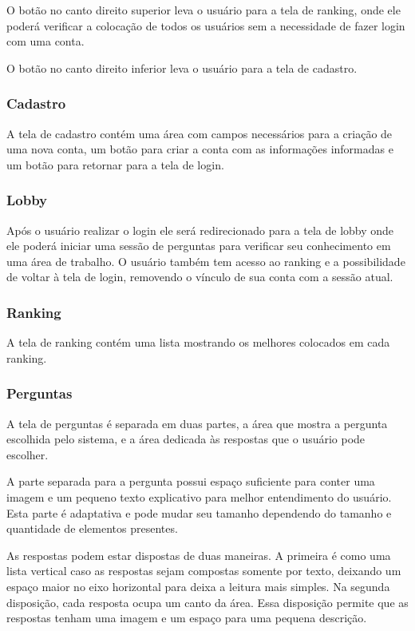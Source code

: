 O botão no canto direito superior leva o usuário para a tela de ranking, onde ele poderá verificar a colocação de todos os usuários sem a necessidade de fazer login com uma conta.
    
O botão no canto direito inferior leva o usuário para a tela de cadastro.

\subsubsection{Cadastro}
\label{subsubsec:cadastro}

A tela de cadastro contém uma área com campos necessários para a criação de uma nova conta, um botão para criar a conta com as informações informadas e um botão para retornar para a tela de login.


\subsubsection{Lobby}
\label{subsubsec:lobby}

Após o usuário realizar o login ele será redirecionado para a tela de lobby onde ele poderá iniciar uma sessão de perguntas para verificar seu conhecimento em uma área de trabalho. O usuário também tem acesso ao ranking e a possibilidade de voltar à tela de login, removendo o vínculo de sua conta com a sessão atual.


\subsubsection{Ranking}
\label{subsubsec:rankingunity}

A tela de ranking contém uma lista mostrando os melhores colocados em cada ranking.


\subsubsection{Perguntas}
\label{subsubsec:perguntasunity}

A tela de perguntas é separada em duas partes, a área que mostra a pergunta escolhida pelo sistema, e a área dedicada às respostas que o usuário pode escolher.

A parte separada para a pergunta possui espaço suficiente para conter uma imagem e um pequeno texto explicativo para melhor entendimento do usuário. Esta parte é adaptativa e pode mudar seu tamanho dependendo do tamanho e quantidade de elementos presentes.

As respostas podem estar dispostas de duas maneiras. A primeira é como uma lista vertical caso as respostas sejam compostas somente por texto, deixando um espaço maior no eixo horizontal para deixa a leitura mais simples. Na segunda disposição, cada resposta ocupa um canto da área. Essa disposição permite que as respostas tenham uma imagem e um espaço para uma pequena descrição.

